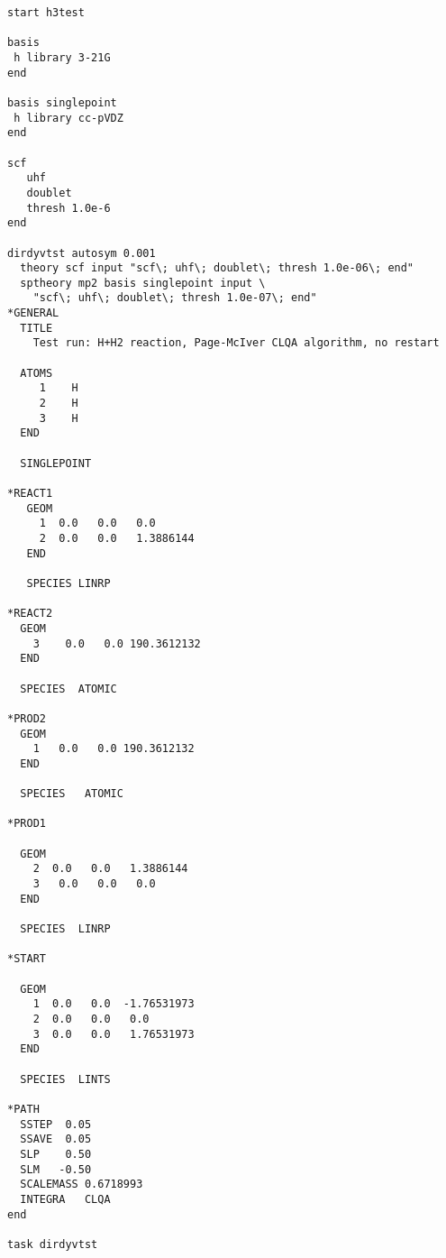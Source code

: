 \begin{verbatim}
start h3test

basis
 h library 3-21G
end

basis singlepoint
 h library cc-pVDZ
end

scf
   uhf
   doublet
   thresh 1.0e-6
end

dirdyvtst autosym 0.001
  theory scf input "scf\; uhf\; doublet\; thresh 1.0e-06\; end"
  sptheory mp2 basis singlepoint input \
    "scf\; uhf\; doublet\; thresh 1.0e-07\; end"
*GENERAL
  TITLE
    Test run: H+H2 reaction, Page-McIver CLQA algorithm, no restart

  ATOMS
     1    H
     2    H
     3    H
  END

  SINGLEPOINT

*REACT1
   GEOM
     1  0.0   0.0   0.0
     2  0.0   0.0   1.3886144
   END

   SPECIES LINRP

*REACT2
  GEOM
    3    0.0   0.0 190.3612132
  END

  SPECIES  ATOMIC

*PROD2
  GEOM
    1   0.0   0.0 190.3612132
  END

  SPECIES   ATOMIC

*PROD1

  GEOM
    2  0.0   0.0   1.3886144
    3   0.0   0.0   0.0
  END

  SPECIES  LINRP

*START

  GEOM
    1  0.0   0.0  -1.76531973
    2  0.0   0.0   0.0
    3  0.0   0.0   1.76531973
  END

  SPECIES  LINTS

*PATH
  SSTEP  0.05
  SSAVE  0.05
  SLP    0.50
  SLM   -0.50
  SCALEMASS 0.6718993
  INTEGRA   CLQA
end

task dirdyvtst
\end{verbatim}

